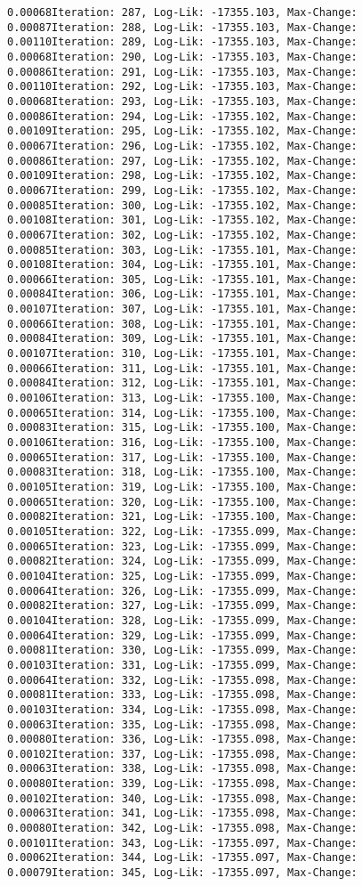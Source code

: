 \documentclass[
]{article}
\begin{document}
\begin{verbatim}
0.00068Iteration: 287, Log-Lik: -17355.103, Max-Change: 0.00087Iteration: 288, Log-Lik: -17355.103, Max-Change: 0.00110Iteration: 289, Log-Lik: -17355.103, Max-Change: 0.00068Iteration: 290, Log-Lik: -17355.103, Max-Change: 0.00086Iteration: 291, Log-Lik: -17355.103, Max-Change: 0.00110Iteration: 292, Log-Lik: -17355.103, Max-Change: 0.00068Iteration: 293, Log-Lik: -17355.103, Max-Change: 0.00086Iteration: 294, Log-Lik: -17355.102, Max-Change: 0.00109Iteration: 295, Log-Lik: -17355.102, Max-Change: 0.00067Iteration: 296, Log-Lik: -17355.102, Max-Change: 0.00086Iteration: 297, Log-Lik: -17355.102, Max-Change: 0.00109Iteration: 298, Log-Lik: -17355.102, Max-Change: 0.00067Iteration: 299, Log-Lik: -17355.102, Max-Change: 0.00085Iteration: 300, Log-Lik: -17355.102, Max-Change: 0.00108Iteration: 301, Log-Lik: -17355.102, Max-Change: 0.00067Iteration: 302, Log-Lik: -17355.102, Max-Change: 0.00085Iteration: 303, Log-Lik: -17355.101, Max-Change: 0.00108Iteration: 304, Log-Lik: -17355.101, Max-Change: 0.00066Iteration: 305, Log-Lik: -17355.101, Max-Change: 0.00084Iteration: 306, Log-Lik: -17355.101, Max-Change: 0.00107Iteration: 307, Log-Lik: -17355.101, Max-Change: 0.00066Iteration: 308, Log-Lik: -17355.101, Max-Change: 0.00084Iteration: 309, Log-Lik: -17355.101, Max-Change: 0.00107Iteration: 310, Log-Lik: -17355.101, Max-Change: 0.00066Iteration: 311, Log-Lik: -17355.101, Max-Change: 0.00084Iteration: 312, Log-Lik: -17355.101, Max-Change: 0.00106Iteration: 313, Log-Lik: -17355.100, Max-Change: 0.00065Iteration: 314, Log-Lik: -17355.100, Max-Change: 0.00083Iteration: 315, Log-Lik: -17355.100, Max-Change: 0.00106Iteration: 316, Log-Lik: -17355.100, Max-Change: 0.00065Iteration: 317, Log-Lik: -17355.100, Max-Change: 0.00083Iteration: 318, Log-Lik: -17355.100, Max-Change: 0.00105Iteration: 319, Log-Lik: -17355.100, Max-Change: 0.00065Iteration: 320, Log-Lik: -17355.100, Max-Change: 0.00082Iteration: 321, Log-Lik: -17355.100, Max-Change: 0.00105Iteration: 322, Log-Lik: -17355.099, Max-Change: 0.00065Iteration: 323, Log-Lik: -17355.099, Max-Change: 0.00082Iteration: 324, Log-Lik: -17355.099, Max-Change: 0.00104Iteration: 325, Log-Lik: -17355.099, Max-Change: 0.00064Iteration: 326, Log-Lik: -17355.099, Max-Change: 0.00082Iteration: 327, Log-Lik: -17355.099, Max-Change: 0.00104Iteration: 328, Log-Lik: -17355.099, Max-Change: 0.00064Iteration: 329, Log-Lik: -17355.099, Max-Change: 0.00081Iteration: 330, Log-Lik: -17355.099, Max-Change: 0.00103Iteration: 331, Log-Lik: -17355.099, Max-Change: 0.00064Iteration: 332, Log-Lik: -17355.098, Max-Change: 0.00081Iteration: 333, Log-Lik: -17355.098, Max-Change: 0.00103Iteration: 334, Log-Lik: -17355.098, Max-Change: 0.00063Iteration: 335, Log-Lik: -17355.098, Max-Change: 0.00080Iteration: 336, Log-Lik: -17355.098, Max-Change: 0.00102Iteration: 337, Log-Lik: -17355.098, Max-Change: 0.00063Iteration: 338, Log-Lik: -17355.098, Max-Change: 0.00080Iteration: 339, Log-Lik: -17355.098, Max-Change: 0.00102Iteration: 340, Log-Lik: -17355.098, Max-Change: 0.00063Iteration: 341, Log-Lik: -17355.098, Max-Change: 0.00080Iteration: 342, Log-Lik: -17355.098, Max-Change: 0.00101Iteration: 343, Log-Lik: -17355.097, Max-Change: 0.00062Iteration: 344, Log-Lik: -17355.097, Max-Change: 0.00079Iteration: 345, Log-Lik: -17355.097, Max-Change: 
\end{verbatim}
\end{document}

